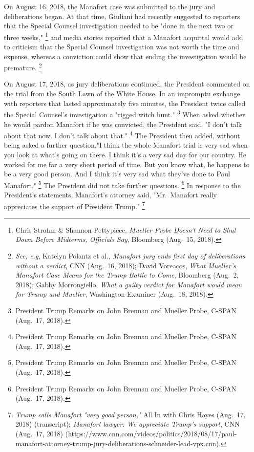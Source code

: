{On August 16, 2018, the Manafort case was submitted to the jury and deliberations began.
At that time, Giuliani had recently suggested to reporters that the Special Counsel investigation needed to be "done in the next two or three weeks,"%
\footnote{Chris Strohm \& Shannon Pettypiece, \textit{Mueller Probe Doesn't Need to Shut Down Before Midterms, Officials Say}, Bloomberg (Aug.~15, 2018).}
and media stories reported that a Manafort acquittal would add to criticism that the Special Counsel investigation was not worth the time and expense, whereas a conviction could show that ending the investigation would be premature.%
\footnote{\textit{See, e.g}, Katelyn Polantz et al., \textit{Manafort jury ends first day of deliberations without a verdict}, CNN (Aug.~16, 2018);
David Voreacos, \textit{What Mueller's Manafort Case Means for the Trump Battle to Come}, Bloomberg (Aug.~2, 2018);
Gabby Morrongiello, \textit{What a guilty verdict for Manafort would mean for Trump and Mueller}, Washington Examiner (Aug.~18, 2018).}

On August 17, 2018, as jury deliberations continued, the President commented on the trial from the South Lawn of the White House.
In an impromptu exchange with reporters that lasted approximately five minutes, the President twice called the Special Counsel's investigation a "rigged witch hunt."%
\footnote{President Trump Remarks on John Brennan and Mueller Probe, C-SPAN (Aug.~17, 2018).}
When asked whether he would pardon Manafort if he was convicted, the President said, "I don't talk about that now.
I don't talk about that."%
\footnote{President Trump Remarks on John Brennan and Mueller Probe, C-SPAN (Aug.~17, 2018).}
The President then added, without being asked a further question,"I think the whole Manafort trial is very sad when you look at what's going on there.
I think it's a very sad day for our country.
He worked for me for a very short period of time.
But you know what, he happens to be a very good person.
And I think it's very sad what they've done to Paul Manafort."%
\footnote{President Trump Remarks on John Brennan and Mueller Probe, C-SPAN (Aug.~17, 2018).}
The President did not take further questions.%
\footnote{President Trump Remarks on John Brennan and Mueller Probe, C-SPAN (Aug.~17, 2018).}
In response to the President's statements, Manafort's attorney said, "Mr.~Manafort really appreciates the support of President Trump."%
\footnote{\textit{Trump calls Manafort "very good person,"} All In with Chris Hayes (Aug.~17, 2018) (transcript);
\textit{Manafort lawyer: We appreciate Trump's support}, CNN (Aug.~17, 2018) (https://www.cnn.com/videos/politics/2018/08/17/paul-manafort-attorney-trump-jury-deliberations-schneider-lead-vpx.cnn).}

}
